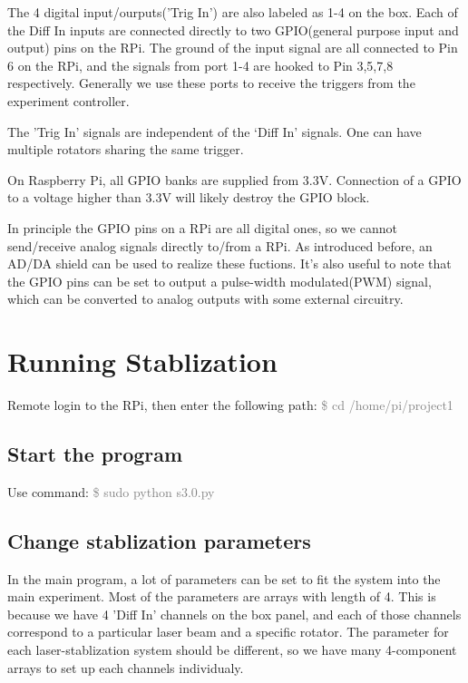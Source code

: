 \documentclass{article}
\begin{document}
The 4 digital input/ourputs('Trig In') are also labeled as 1-4 on the box. Each of the Diff In inputs are connected directly to two GPIO(general purpose input and output) pins on the RPi. The ground of the input signal are all connected to Pin 6 on the RPi, and the signals from port 1-4 are hooked to Pin 3,5,7,8 respectively. Generally we use these ports to receive the triggers from the experiment controller.\newline

The 'Trig In' signals are independent of the ‘Diff In' signals. One can have multiple rotators sharing the same trigger.\newline

On Raspberry Pi, all GPIO banks are supplied from 3.3V. Connection of a GPIO to a voltage higher than 3.3V will likely destroy the GPIO block.\newline

In principle the GPIO pins on a RPi are all digital ones, so we cannot send/receive analog signals directly to/from a RPi. As introduced before, an AD/DA shield can be used to realize these fuctions. It's also useful to note that the GPIO pins can be set to output a pulse-width modulated(PWM) signal, which can be converted to analog outputs with some external circuitry. 
\section{Running Stablization}
Remote login to the RPi, then enter the following path:\newline
\textcolor{gray}{\$ cd /home/pi/project1}\newline
\subsection{Start the program}
Use command:\newline
\textcolor{gray}{\$ sudo python s3.0.py}\newline
\subsection{Change stablization parameters}
In the main program, a lot of parameters can be set to fit the system into the main experiment. Most of the parameters are arrays with length of 4. This is because we have 4 'Diff In' channels on the box panel, and each of those channels correspond to a particular laser beam and a specific rotator. The parameter for each laser-stablization system should be different, so we have many 4-component arrays to set up each channels individualy.\newline
\end{document}
